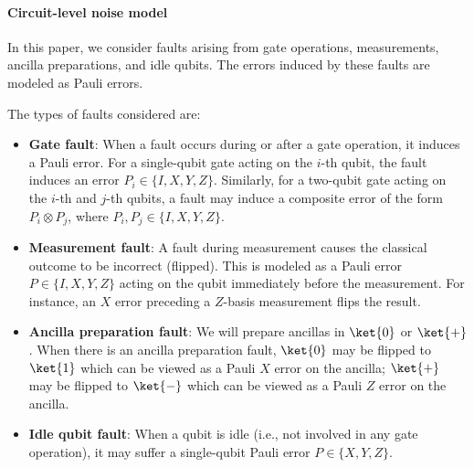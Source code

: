 \documentclass[acmsmallw,review]{acmart}
\begin{document}
\paragraph{\textbf{Circuit-level noise model }}
In this paper, we consider faults arising from gate operations, measurements, ancilla preparations, and idle qubits. The errors induced by these faults are modeled as Pauli errors.

The types of faults considered are:
\begin{itemize}
    \item \textbf{Gate fault}: 
When a fault occurs during or after a gate operation, it induces a Pauli error. For a single-qubit gate acting on the $i$-th qubit, the fault induces an error $P_i \in \{I, X, Y, Z\}$. Similarly, for a two-qubit gate acting on the $i$-th and $j$-th qubits, a fault may induce a composite error of the form $P_i \otimes P_j$, where $P_i, P_j \in \{I, X, Y, Z\}$.
    \item \textbf{Measurement fault}: 
    A fault during measurement causes the classical outcome to be incorrect (flipped). This is modeled as a Pauli error $P \in \{I, X, Y, Z\}$ acting on the qubit immediately before the measurement. For instance, an $X$ error preceding a $Z$-basis measurement flips the result.

    \item \textbf{Ancilla preparation fault}: We will prepare ancillas in $\ket{0}$ or $\ket{+}$. When there is an ancilla preparation fault, $\ket{0}$ may be flipped to $\ket{1}$ which can be viewed as a Pauli $X$ error on the ancilla; $\ket{+}$ may be flipped to $\ket{-}$ which can be viewed as a Pauli $Z$ error on the ancilla.
    
    \item \textbf{Idle qubit fault}: 
    When a qubit is idle (i.e., not involved in any gate operation), it may suffer a single-qubit Pauli error $P \in \{X, Y, Z\}$.
\end{itemize}
\end{document}
